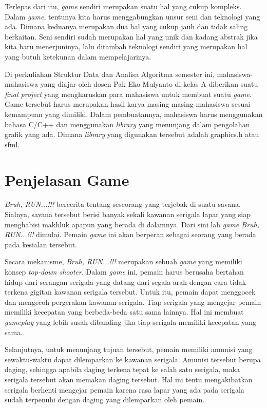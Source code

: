 \documentclass[oneside, a4paper ,12pt]{book}
\begin{document}
	Terlepas dari itu, \textit{game} sendiri merupakan suatu hal yang cukup kompleks. Dalam \textit{game}, tentunya kita harus menggabungkan unsur seni dan teknologi yang ada. Dimana keduanya merupakan dua hal yang cukup jauh dan tidak saling berkaitan. Seni sendiri sudah merupakan hal yang unik dan kadang abstrak jika kita baru menerjuninya, lalu ditambah teknologi sendiri yang merupakan hal yang butuh ketekunan dalam mempelajarinya.
	
	Di perkuliahan Struktur Data dan Analisa Algoritma semester ini, mahasiswa-mahasiswa yang diajar oleh dosen Pak Eko Mulyanto di kelas A diberikan suatu \emph{final project} yang mengharuskan para mahasiswa untuk membuat suatu \textit{game}. Game tersebut harus merupakan hasil karya masing-masing mahasiswa sesuai kemampuan yang dimiliki. Dalam pembuatannya, mahasiswa harus menggunakan bahasa C/C++ dan menggunakan \textit{library} yang menunjang dalam pengolahan grafik yang ada. Dimana \textit{library} yang digunakan tersebut adalah graphics.h atau sfml.
	
	\section{Penjelasan Game}
	
	\textit{Bruh, RUN...!!!} bercerita tentang seseorang yang terjebak di suatu savana. Sialnya, savana tersebut berisi banyak sekali kawanan serigala lapar yang siap menghabisi makhluk apapun yang berada di dalamnya. Dari sini lah \textit{game Bruh, RUN...!!!} dimulai. Pemain \textit{game} ini akan berperan sebagai seorang yang berada pada kesialan tersebut.
	
	Secara mekanisme, \textit{Bruh, RUN...!!!} merupakan sebuah \textit{game} yang memiliki konsep \textit{top-down shooter}. Dalam \textit{game} ini, pemain harus berusaha bertahan hidup dari serangan serigala yang datang dari segala arah dengan cara tidak terkena gigitan kawanan serigala tersebut. Untuk itu, pemain dapat menggocek dan mengecoh pergerakan kawanan serigala. Tiap serigala yang mengejar pemain memiliki kecepatan yang berbeda-beda satu sama lainnya. Hal ini membuat \textit{gameplay} yang lebih susah dibanding jika tiap serigala memiliki kecepatan yang sama.
	
	Selanjutnya, untuk menunjang tujuan tersebut, pemain memiliki amunisi yang sewaktu-waktu dapat dilemparkan ke kawanan serigala. Amunisi tersebut berupa daging, sehingga apabila daging terkena tepat ke salah satu serigala, maka serigala tersebut akan memakan daging tersebut. Hal ini tentu mengakibatkan serigala berhenti mengejar pemain karena rasa lapar yang ada pada serigala sudah terpenuhi dengan daging yang dilemparkan oleh pemain.
	
\end{document}
